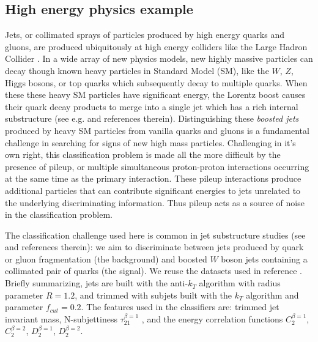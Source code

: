 \documentclass[twocolumn,superscriptaddress,aps]{revtex4-1}
\theoremstyle{plain}
\begin{document}
\subsection{High energy physics example}

Jets, or collimated sprays of particles produced by high energy quarks and
gluons, are produced ubiquitously at high energy colliders like the Large Hadron
Collider \citep{LHCMachine}.  In a wide array of new physics models, new highly
massive particles can decay though known heavy particles in Standard Model (SM),
like the $W$, $Z$, Higgs bosons, or top quarks which subsequently decay to
multiple quarks.  When these these heavy SM particles have significant energy,
the Lorentz boost causes their quark decay products to merge into a single jet
which has a rich internal substructure (see e.g.
\citep{Altheimer:2012mn,Altheimer:2013yza} and references therein).
Distinguishing these \textit{boosted jets} produced by heavy SM particles from
vanilla quarks and  gluons is a fundamental challenge in searching for signs of
new high mass particles. Challenging in it's own right, this classification
problem is made all the more difficult by the presence of pileup, or multiple
simultaneous proton-proton interactions occurring at the same time as the primary
interaction.  These pileup interactions produce additional particles that can
contribute significant energies to jets unrelated to the underlying
discriminating information. Thus pileup acts as a source of noise in the
classification problem.

The classification challenge used here is common in jet substructure
studies (see \citep{Khachatryan:2014vla,ATL-PHYS-PUB-2015-033,wbosonATLAS} and
references therein): we aim to discriminate between jets produced by quark or gluon fragmentation (the
background) and  boosted $W$ boson jets containing a collimated pair of
quarks (the signal).  We reuse the datasets used in reference
\citep{guest2016jet}.  Briefly summarizing, jets are built with the
anti-$k_T$ algorithm \citep{Cacciari:2008gp}
with radius parameter $R=1.2$, and trimmed \citep{Krohn:2009th} with subjets built with
the $k_T$ algorithm and parameter $f_{cut}=0.2$. The features used
in the classifiers are: trimmed jet invariant mass, N-subjettiness
$\tau_{21}^{\beta=1}$ \citep{nsub,Thaler2012}, and the energy correlation
functions \citep{Larkoski2013} $C_{2}^{\beta=1}$, $C_{2}^{\beta=2}$,
$D_{2}^{\beta=1}$, $D_{2}^{\beta=2}$.
\end{document}
